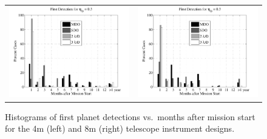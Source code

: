  \begin{figure}[ht]
 \begin{center}
  \begin{tabular}{c c}
   \includegraphics[width=2.9in]{./figures/c4_firstDetHist} &
   \includegraphics[width=2.9in]{./figures/c8_firstDetHist}
   \end{tabular}
 \end{center}
 \caption[First detection histograms]{ \label{fig:firstDetHists} Histograms of first planet detections vs.~months after mission start for the 4m (left) and 8m (right) telescope instrument designs.}
 \end{figure}
 
